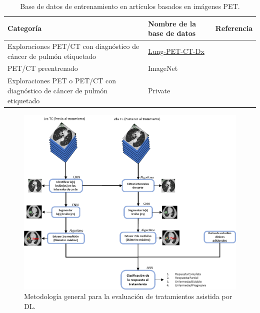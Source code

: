 \documentclass[11pt,a4paper,openany]{article}
\begin{document}
    \begin{table}[H]
            \caption{Base de datos de entrenamiento en artículos basados en imágenes PET.\label{tab:PETDatabase}}
            \begin{tabular}{p{6.5cm} p{3cm} p{5cm}}
            \hline
            \bf{Categoría} & \bf{Nombre de la base de datos} & \bf{Referencia} \\
            \hline
            Exploraciones PET/CT con diagnóstico de cáncer de pulmón etiquetado & \href{https://www.cancerimagingarchive.net/collection/lung-pet-ct-dx/}{Lung-PET-CT-Dx} & \cite{Protonotarios2022,Lei2022,Xia2023} \\
            \hline
            PET/CT preentrenado & ImageNet & \cite{Li2024} \\
            \hline
            Exploraciones PET o PET/CT con diagnóstico de cáncer de pulmón etiquetado & Private & \cite{Zhang2019,Chen2022,Fruh2021,Theophraste2018,Zhao2018,Leung2020,Park2022,Yu2023,Amyar2022} \\
            \hline
            \end{tabular}
    \end{table}

        
        

    \begin{figure}[H]
        \centering
        \includegraphics[width=15 cm]{SecuentialStepsEvaluation-Diagram-DL.png}
        \caption {Metodología general para la evaluación de tratamientos asistida por DL.\label{fig:SSE}}
    \end{figure}
\end{document}
